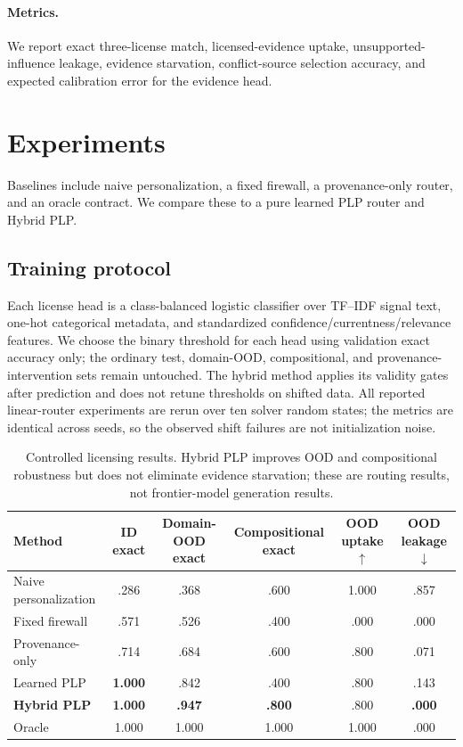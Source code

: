 \documentclass[10pt,twocolumn]{article}
\begin{document}
\paragraph{Metrics.} We report exact three-license match, licensed-evidence uptake, unsupported-influence leakage, evidence starvation, conflict-source selection accuracy, and expected calibration error for the evidence head.

\section{Experiments}
Baselines include naive personalization, a fixed firewall, a provenance-only router, and an oracle contract. We compare these to a pure learned PLP router and Hybrid PLP.

\subsection{Training protocol}
Each license head is a class-balanced logistic classifier over TF--IDF signal text, one-hot categorical metadata, and standardized confidence/currentness/relevance features. We choose the binary threshold for each head using validation exact accuracy only; the ordinary test, domain-OOD, compositional, and provenance-intervention sets remain untouched. The hybrid method applies its validity gates after prediction and does not retune thresholds on shifted data. All reported linear-router experiments are rerun over ten solver random states; the metrics are identical across seeds, so the observed shift failures are not initialization noise.

\begin{table}[t]\centering\small
\begin{tabular}{lccccc}\toprule
Method & ID exact & Domain-OOD exact & Compositional exact & OOD uptake $\uparrow$ & OOD leakage $\downarrow$\\\midrule
Naive personalization & .286 & .368 & .600 & 1.000 & .857\\
Fixed firewall & .571 & .526 & .400 & .000 & .000\\
Provenance-only & .714 & .684 & .600 & .800 & .071\\
Learned PLP & \textbf{1.000} & .842 & .400 & .800 & .143\\
\textbf{Hybrid PLP} & \textbf{1.000} & \textbf{.947} & \textbf{.800} & .800 & \textbf{.000}\\
Oracle & 1.000 & 1.000 & 1.000 & 1.000 & .000\\\bottomrule
\end{tabular}
\caption{Controlled licensing results. Hybrid PLP improves OOD and compositional robustness but does not eliminate evidence starvation; these are routing results, not frontier-model generation results.}
\end{table}
\end{document}
